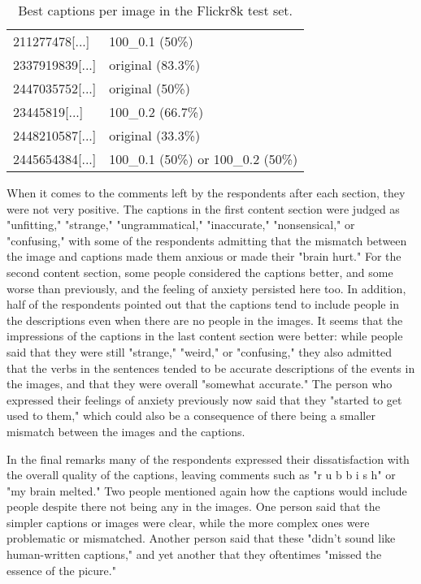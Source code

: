 \documentclass[11pt]{article}
\begin{document}
\begin{table}[h]
\begin{center}
\begin{tabular}{|p{2.5cm}|p{3cm}|}
            211277478[...]   & 100\_0.1 (50\%)                    \\
            2337919839[...]  & original (83.3\%)                  \\
            2447035752[...]  & original (50\%)                    \\
            23445819[...]    & 100\_0.2 (66.7\%)                  \\
            2448210587[...]  & original (33.3\%)                  \\
            2445654384[...]  & 100\_0.1 (50\%) or 100\_0.2 (50\%) \\
            \hline
        \end{tabular}
    \end{center}
    \caption{\label{flickr-table} Best captions per image in the Flickr8k test set. }
\end{table}

When it comes to the comments left by the respondents after each section, they were not very positive. The captions in the first content section were judged as "unfitting," "strange," "ungrammatical," "inaccurate," "nonsensical," or "confusing," with some of the respondents admitting that the mismatch between the image and captions made them anxious or made their "brain hurt." For the second content section, some people considered the captions better, and some worse than previously, and the feeling of anxiety persisted here too. In addition, half of the respondents pointed out that the captions tend to include people in the descriptions even when there are no people in the images. It seems that the impressions of the captions in the last content section were better: while people said that they were still "strange," "weird," or "confusing," they also admitted that the verbs in the sentences tended to be accurate descriptions of the events in the images, and that they were overall "somewhat accurate." The person who expressed their feelings of anxiety previously now said that they "started to get used to them," which could also be a consequence of there being a smaller mismatch between the images and the captions.

In the final remarks many of the respondents expressed their dissatisfaction with the overall quality of the captions, leaving comments such as "r u b b i s h" or "my brain melted." Two people mentioned again how the captions would include people despite there not being any in the images. One person said that the simpler captions or images were clear, while the more complex ones were problematic or mismatched. Another person said that these "didn't sound like human-written captions," and yet another that they oftentimes "missed the essence of the picure."
\end{document}
